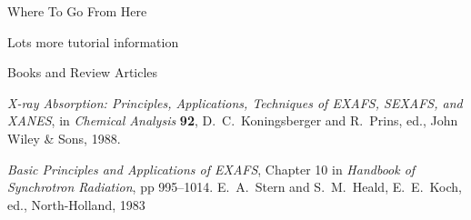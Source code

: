 \begin{slide}{Where To Go From Here}

    \begin{entry}
    \item[{Lots more tutorial information}]
      {}

    \item[{Books and Review Articles}]  

      {\emph{X-ray Absorption: Principles, Applications, Techniques of
           EXAFS, SEXAFS, and XANES}}, in {\slshape{Chemical Analysis}}
       {\bf{92}}, D.~C.~Koningsberger and R.~Prins, ed., John Wiley \& Sons,      1988.
      
       {\emph{Basic Principles and Applications of EXAFS}}, Chapter 10 in
       {\slshape{Handbook of Synchrotron Radiation}}, pp 995--1014.
       E.~A.~Stern and S.~M.~Heald, E.~E.~Koch, ed., North-Holland, 1983
      
    \end{entry}
\vfill

\end{slide} 
